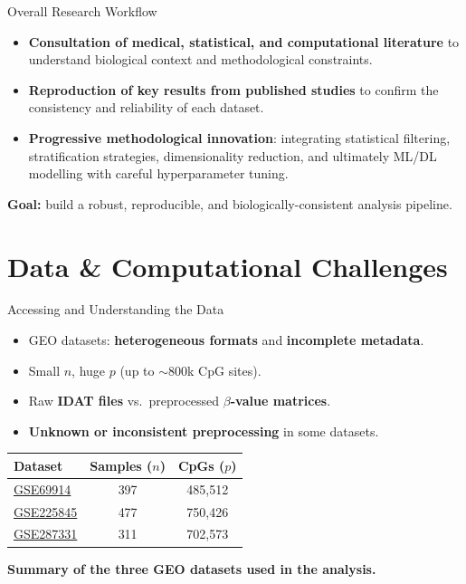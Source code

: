 \documentclass[8pt]{beamer}
\begin{document}
\begin{frame}{Overall Research Workflow}
    \begin{itemize}[label=-]
        \item \textbf{Consultation of medical, statistical, and computational literature}  
              to understand biological context and methodological constraints.
        \item \textbf{Reproduction of key results from published studies}  
              to confirm the consistency and reliability of each dataset.
        \item \textbf{Progressive methodological innovation}:  
              integrating statistical filtering, stratification strategies,  
              dimensionality reduction, and ultimately ML/DL modelling  
              with careful hyperparameter tuning.
    \end{itemize}

    \vspace{0.25cm}
    {\small\color{gray}
    \textbf{Goal:} build a robust, reproducible, and biologically-consistent analysis pipeline.
    }
\end{frame}


\section{Data \& Computational Challenges}



\begin{frame}{Accessing and Understanding the Data}
    \begin{itemize}[label=-]
        \item GEO datasets: \textbf{heterogeneous formats} and \textbf{incomplete metadata}.
        \item \alert{Small $n$, huge $p$} (up to $\sim$800k CpG sites).
        \item Raw \textbf{IDAT files} vs.\ preprocessed \textbf{$\beta$-value matrices}.
        \item \textbf{Unknown or inconsistent preprocessing} in some datasets.
    \end{itemize}

    \vspace{0.45cm}
    \centering
    \begin{tabular}{lcc}
    \toprule
    \textbf{Dataset} & \textbf{Samples ($n$)} & \textbf{CpGs ($p$)} \\ \midrule
    \href{https://www.ncbi.nlm.nih.gov/geo/query/acc.cgi?acc=GSE69914}{GSE69914}   & 397 & 485{,}512 \\
    \href{https://www.ncbi.nlm.nih.gov/geo/query/acc.cgi?acc=GSE225845}{GSE225845} & 477 & 750{,}426 \\
    \href{https://www.ncbi.nlm.nih.gov/geo/query/acc.cgi?acc=GSE287331}{GSE287331} & 311 & 702{,}573 \\ \bottomrule
\end{tabular}

\vspace{0.15cm}
{\small 
\textbf{Summary of the three GEO datasets used in the analysis.}  

}

\end{frame}
\end{document}
